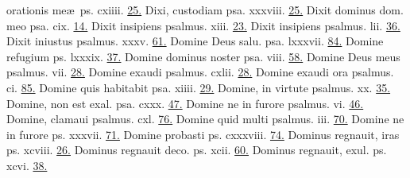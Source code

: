 \documentclass[a5paper,10pt]{book}
\def\ae{æ}
\begin{document}
\begin{multicols}{2}
\newline \indent orationis me\ae \ ps. cxiiii. \hfill \hyperlink{ps114}{25.}
\newline Dixi, custodiam psa. xxxviii. \hfill \hyperlink{ps38}{25.}
\newline Dixit dominus dom. meo psa. cix. \hfill \hyperlink{ps109}{14.}
\newline Dixit insipiens psalmus. xiii. \hfill \hyperlink{ps13}{23.}
\newline Dixit insipiens psalmus. lii. \hfill \hyperlink{ps52}{36.}
\newline Dixit iniustus psalmus. xxxv. \hfill \hyperlink{ps35}{61.}
\newline Domine Deus salu. psa. lxxxvii. \hfill \hyperlink{ps87}{84.}
\newline Domine refugium ps. lxxxix. \hfill \hyperlink{ps89}{37.}
\newline Domine dominus noster psa. viii. \hfill \hyperlink{ps8}{58.}
\newline Domine Deus meus psalmus. vii. \hfill \hyperlink{ps7}{28.}
\newline Domine exaudi psalmus. cxlii. \hfill \hyperlink{ps142}{28.}
\newline Domine exaudi ora psalmus. ci. \hfill \hyperlink{ps101}{85.}
\newline Domine quis habitabit psa. xiiii. \hfill \hyperlink{ps14}{29.}
\newline Domine, in virtute psalmus. xx. \hfill \hyperlink{ps20}{35.}
\newline Domine, non est exal. psa. cxxx. \hfill \hyperlink{ps130}{47.}
\newline Domine ne in furore psalmus. vi. \hfill \hyperlink{ps6}{46.}
\newline Domine, clamaui psalmus. cxl. \hfill \hyperlink{ps140}{76.}
\newline Domine quid multi psalmus. iii. \hfill \hyperlink{ps3}{70.}
\newline Domine ne in furore ps. xxxvii. \hfill \hyperlink{ps37}{71.}
\newline Domine probasti ps. cxxxviii. \hfill \hyperlink{ps138}{74.}
\newline Dominus regnauit, iras ps. xcviii. \hfill \hyperlink{ps98}{26.}
\newline Dominus regnauit deco. ps. xcii. \hfill \hyperlink{ps92}{60.}
\newline Dominus regnauit, exul. ps. xcvi. \hfill \hyperlink{ps96}{38.}

\end{multicols}
\end{document}
